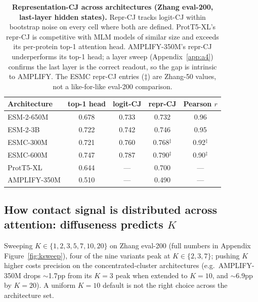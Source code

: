 \documentclass{article}
\begin{document}
\begin{table}[h]
\centering
\small
\caption{\textbf{Representation-CJ across architectures (Zhang eval-200,
last-layer hidden states).} Repr-CJ tracks logit-CJ within bootstrap
noise on every cell where both are defined. ProtT5-XL's repr-CJ is
competitive with MLM models of similar size and exceeds its per-protein
top-1 attention head. AMPLIFY-350M's repr-CJ underperforms its top-1
head; a layer sweep (Appendix~\ref{app:a4}) confirms the last layer is
the correct readout, so the gap is intrinsic to AMPLIFY. The ESMC
repr-CJ entries ($\ddagger$) are Zhang-50 values, not a like-for-like
eval-200 comparison.\protect\footnotemark}
\label{tab:repr-cj-arch}
\begin{tabular}{lcccc}
\toprule
Architecture & top-1 head & logit-CJ & repr-CJ & Pearson $r$ \\
\midrule
ESM-2-650M  & 0.678 & 0.733 & 0.732 & 0.96 \\
ESM-2-3B    & 0.722 & 0.742 & 0.746 & 0.95 \\
ESMC-300M   & 0.721 & 0.760 & 0.768$^{\ddagger}$ & 0.92$^{\ddagger}$ \\
ESMC-600M   & 0.747 & 0.787 & 0.790$^{\ddagger}$ & 0.90$^{\ddagger}$ \\
ProtT5-XL   & 0.644 & ---   & 0.700 & ---  \\
AMPLIFY-350M& 0.510 & ---   & 0.490 & ---  \\
\bottomrule
\end{tabular}
\end{table}

\subsection{How contact signal is distributed across attention: diffuseness predicts $K$}
\label{sec:ksweep}

Sweeping $K \in \{1, 2, 3, 5, 7, 10, 20\}$ on Zhang eval-200 (full numbers in
Appendix Figure~\ref{fig:ksweep}), four of the nine variants peak at
$K \in \{2, 3, 7\}$; pushing $K$ higher costs precision on the
concentrated-cluster architectures (e.g.\ AMPLIFY-350M drops $\sim$1.7pp
from its $K{=}3$ peak when extended to $K{=}10$, and $\sim$6.9pp by $K{=}20$).
A uniform $K{=}10$ default is not the right choice across the architecture set.
\end{document}
